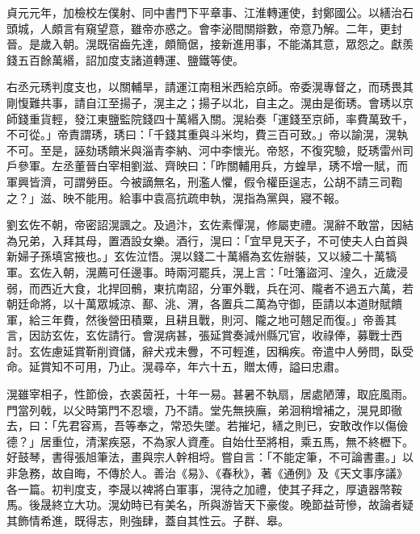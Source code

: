 \begin{pinyinscope}
 貞元元年，加檢校左僕射、同中書門下平章事、江淮轉運使，封鄭國公。以繕治石頭城，人頗言有窺望意，雖帝亦惑之。會李泌間關辯數，帝意乃解。二年，更封晉。是歲入朝。滉既宿齒先達，頗簡倨，接新進用事，不能滿其意，眾怨之。獻羨錢五百餘萬緡，詔加度支諸道轉運、鹽鐵等使。



 右丞元琇判度支也，以關輔旱，請運江南租米西給京師。帝委滉專督之，而琇畏其剛愎難共事，請自江至揚子，滉主之；揚子以北，自主之。滉由是銜琇。會琇以京師錢重貨輕，發江東鹽監院錢四十萬緡入關。滉紿奏「運錢至京師，率費萬致千，不可從。」帝責謂琇，琇曰：「千錢其重與斗米均，費三百可致。」帝以諭滉，滉執不可。至是，誣劾琇饋米與淄青李納、河中李懷光。帝怒，不復究驗，貶琇雷州司戶參軍。左丞董晉白宰相劉滋、齊映曰：「昨關輔用兵，方蝗旱，琇不增一賦，而軍興皆濟，可謂勞臣。今被謫無名，刑濫人懼，假令權臣逞志，公胡不請三司鞫之？」滋、映不能用。給事中袁高抗疏申執，滉指為黨與，寢不報。



 劉玄佐不朝，帝密詔滉諷之。及過汴，玄佐素憚滉，修屬吏禮。滉辭不敢當，因結為兄弟，入拜其母，置酒設女樂。酒行，滉曰：「宜早見天子，不可使夫人白首與新婦子孫填宮掖也。」玄佐泣悟。滉以錢二十萬緡為玄佐辦裝，又以綾二十萬犒軍。玄佐入朝，滉薦可任邊事。時兩河罷兵，滉上言：「吐籓盜河、湟久，近歲浸弱，而西近大食，北捍回鶻，東抗南詔，分軍外戰，兵在河、隴者不過五六萬，若朝廷命將，以十萬眾城涼、鄯、洮、渭，各置兵二萬為守御，臣請以本道財賦饋軍，給三年費，然後營田積粟，且耕且戰，則河、隴之地可翹足而復。」帝善其言，因訪玄佐，玄佐請行。會滉病甚，張延賞奏減州縣冗官，收祿俸，募戰士西討。玄佐慮延賞靳削資儲，辭犬戎未釁，不可輕進，因稱疾。帝遣中人勞問，臥受命。延賞知不可用，乃止。滉尋卒，年六十五，贈太傅，謚曰忠肅。



 滉雖宰相子，性節儉，衣裘茵衽，十年一易。甚暑不執扇，居處陋薄，取庇風雨。門當列戟，以父時第門不忍壞，乃不請。堂先無挾廡，弟洄稍增補之，滉見即徹去，曰：「先君容焉，吾等奉之，常恐失墜。若摧圮，繕之則已，安敢改作以傷儉德？」居重位，清潔疾惡，不為家人資產。自始仕至將相，乘五馬，無不終櫪下。好鼓琴，書得張旭筆法，畫與宗人幹相埒。嘗自言：「不能定筆，不可論書畫。」以非急務，故自晦，不傳於人。善治《易》、《春秋》，著《通例》及《天文事序議》各一篇。初判度支，李晟以裨將白軍事，滉待之加禮，使其子拜之，厚遺器幣鞍馬。後晟終立大功。滉幼時已有美名，所與游皆天下豪俊。晚節益苛慘，故論者疑其飾情希進，既得志，則強肆，蓋自其性云。子群、皋。




\end{pinyinscope}
